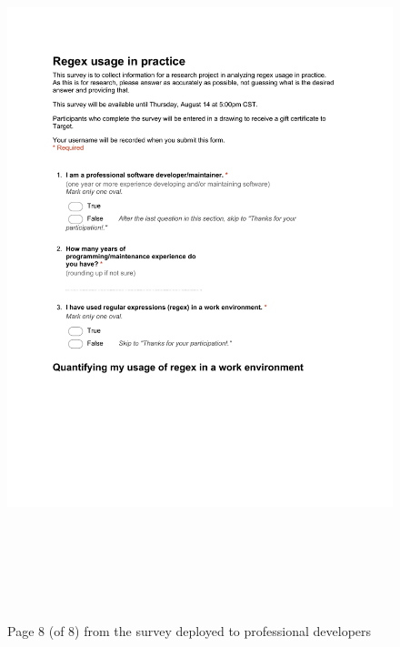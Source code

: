 \begin{figure}[!htbp]
   \centering
       \includegraphics[page=8, height=21cm,keepaspectratio]{nontex/appendix/regexUsageInPracticeSurvey}
 \caption{Page 8 (of 8) from the survey deployed to professional developers}
 \label{fig:surveyPDF8}
\end{figure}

\afterpage{\clearpage}





% 













% 





% 
\afterpage{\clearpage}

